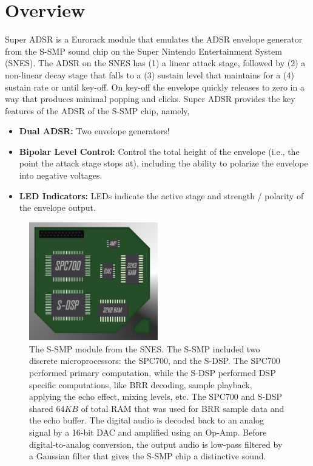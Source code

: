 \documentclass[12pt,letter]{article}
\begin{document}


\section{Overview}

Super ADSR is a Eurorack module that emulates the ADSR envelope generator from the S-SMP sound chip on the Super Nintendo Entertainment System (SNES). The ADSR on the SNES has (1) a linear attack stage, followed by (2) a non-linear decay stage that falls to a (3) sustain level that maintains for a (4) sustain rate or until key-off. On key-off the envelope quickly releases to zero in a way that produces minimal popping and clicks. Super ADSR provides the key features of the ADSR of the S-SMP chip, namely,
\begin{itemize}
  \item \textbf{Dual ADSR:} Two envelope generators!
  \item \textbf{Bipolar Level Control:} Control the total height of the envelope (i.e., the point the attack stage stops at), including the ability to polarize the envelope into negative voltages.
  \item \textbf{LED Indicators:} LEDs indicate the active stage and strength / polarity of the envelope output.
\end{itemize}

\begin{figure}[!b]
\centering
\includegraphics[width=0.5\textwidth]{img/Chip}
\caption{\small The S-SMP module from the SNES. The S-SMP included two discrete microprocessors: the SPC700, and the S-DSP. The SPC700 performed primary computation, while the S-DSP performed DSP specific computations, like BRR decoding, sample playback, applying the echo effect, mixing levels, etc. The SPC700 and S-DSP shared $64KB$ of total RAM that was used for BRR sample data and the echo buffer. The digital audio is decoded back to an analog signal by a 16-bit DAC and amplified using an Op-Amp. Before digital-to-analog conversion, the output audio is low-pass filtered by a Gaussian filter that gives the S-SMP chip a distinctive sound.}
\end{figure}
\end{document}
